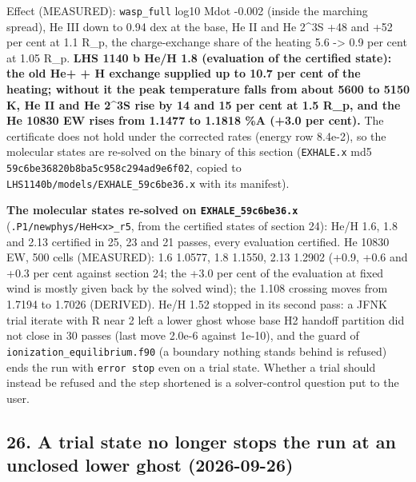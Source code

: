 \documentclass[english,a4paper]{my_memo}
\begin{document}
Effect (MEASURED): \texttt{wasp\_full} log10 Mdot -0.002 (inside the marching spread),
He III down to 0.94 dex at the base, He II and He 2\^{}3S +48 and +52 per cent at
1.1 R\_p, the charge-exchange share of the heating 5.6 -\textgreater{} 0.9 per cent at 1.05
R\_p. \textbf{LHS 1140 b He/H 1.8 (evaluation of the certified state): the old
He+ + H exchange supplied up to 10.7 per cent of the heating; without it the
peak temperature falls from about 5600 to 5150 K, He II and He 2\^{}3S rise by
14 and 15 per cent at 1.5 R\_p, and the He 10830 EW rises from 1.1477 to 1.1818
\%A (+3.0 per cent).} The certificate does not hold under the corrected rates
(energy row 8.4e-2), so the molecular states are re-solved on the binary of
this section (\texttt{EXHALE.x} md5 \texttt{59c6be36820b8ba5c958c294ad9e6f02}, copied to
\texttt{LHS1140b/models/EXHALE\_59c6be36.x} with its manifest).

\textbf{The molecular states re-solved on \texttt{EXHALE\_59c6be36.x}} (\texttt{.P1/newphys/HeH\textless{}x\textgreater{}\_r5},
from the certified states of section 24): He/H 1.6, 1.8 and 2.13 certified in
25, 23 and 21 passes, every evaluation certified. He 10830 EW, 500 cells
(MEASURED): 1.6 1.0577, 1.8 1.1550, 2.13 1.2902 (+0.9, +0.6 and +0.3 per cent
against section 24; the +3.0 per cent of the evaluation at fixed wind is
mostly given back by the solved wind); the 1.108 crossing moves from 1.7194
to 1.7026 (DERIVED). He/H 1.52 stopped in its second pass: a JFNK trial
iterate with \textbar\textbar R\textbar\textbar{} near 2 left a lower ghost whose base H2 handoff partition
did not close in 30 passes (last move 2.0e-6 against 1e-10), and the guard of
\texttt{ionization\_equilibrium.f90} (a boundary nothing stands behind is refused)
ends the run with \texttt{error\ stop} even on a trial state. Whether a trial should
instead be refused and the step shortened is a solver-control question put
to the user.

\subsection{26. A trial state no longer stops the run at an unclosed lower ghost (2026-09-26)}\label{26-a-trial-state-no-longer-stops-the-run-at-an-unclosed-lower-ghost-2026-09-26}
\end{document}
